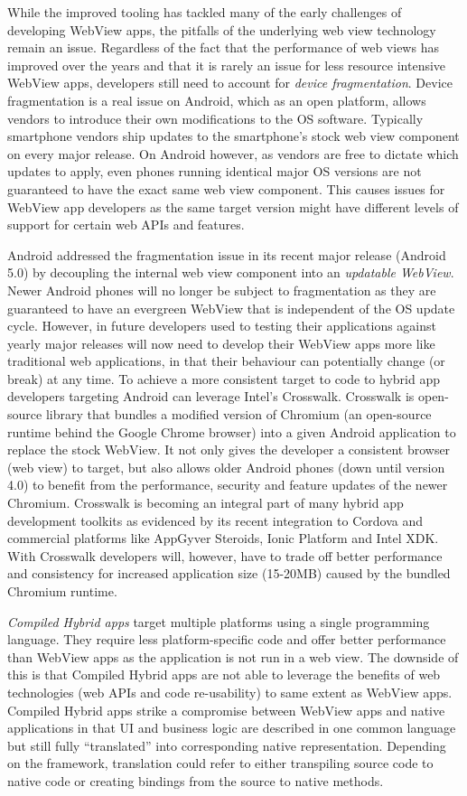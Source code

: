 \documentclass[thesis.tex]{subfiles}
\begin{document}
While the improved tooling has tackled many of the early challenges of developing WebView apps, the pitfalls of the underlying web view technology remain an issue. Regardless of the fact that the performance of web views has improved over the years and that it is rarely an issue for less resource intensive WebView apps, developers still need to account for \textit{device fragmentation}. Device fragmentation is a real issue on Android, which as an open platform, allows vendors to introduce their own modifications to the OS software. Typically smartphone vendors ship updates to the smartphone's stock web view component on every major release. On Android however, as vendors are free to dictate which updates to apply, even phones running identical major OS versions are not guaranteed to have the exact same web view component. This causes issues for WebView app developers as the same target version might have different levels of support for certain web APIs and features.

Android addressed the fragmentation issue in its recent major release (Android 5.0) by decoupling the internal web view component into an \textit{updatable WebView}. Newer Android phones will no longer be subject to fragmentation as they are guaranteed to have an evergreen WebView that is independent of the OS update cycle. However, in future developers used to testing their applications against yearly major releases will now need to develop their WebView apps more like traditional web applications, in that their behaviour can potentially change (or break) at any time. To achieve a more consistent target to code to hybrid app developers targeting Android can leverage Intel's Crosswalk. Crosswalk is open-source library that bundles a modified version of Chromium (an open-source runtime behind the Google Chrome browser) into a given Android application to replace the stock WebView. It not only gives the developer a consistent browser (web view) to target, but also allows older Android phones (down until version 4.0) to benefit from the performance, security and feature updates of the newer Chromium. Crosswalk is becoming an integral part of many hybrid app development toolkits as evidenced by its recent integration to Cordova and commercial platforms like AppGyver Steroids, Ionic Platform and Intel XDK. With Crosswalk developers will, however, have to trade off better performance and consistency for increased application size (15-20MB) caused by the bundled Chromium runtime.

\textit{Compiled Hybrid apps} target multiple platforms using a single programming language. They require less platform-specific code and offer better performance than WebView apps as the application is not run in a web view. The downside of this is that Compiled Hybrid apps are not able to leverage the benefits of web technologies (web APIs and code re-usability) to same extent as WebView apps. Compiled Hybrid apps strike a compromise between WebView apps and native applications in that UI and business logic are described in one common language but still fully ``translated'' into corresponding native representation. Depending on the framework, translation could refer to either transpiling source code to native code or creating bindings from the source to native methods.
\end{document}
